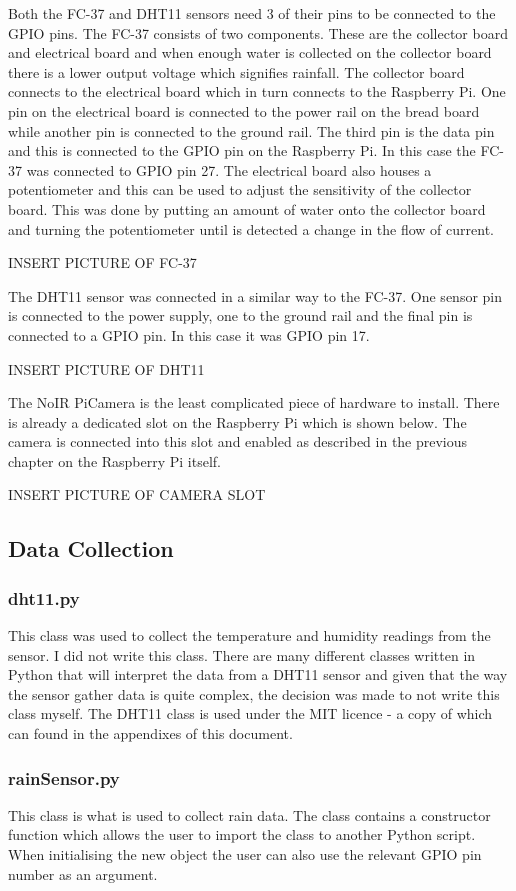 \documentclass[10pt,a4paper]{article}
\begin{document}
Both the FC-37 and DHT11 sensors need 3 of their pins to be connected to the GPIO pins. The FC-37 consists of two components. These are the collector board and electrical board and when enough water is collected on the collector board there is a lower output voltage which signifies rainfall. The collector board connects to the electrical board which in turn connects to the Raspberry Pi. One pin on the electrical board is connected to the power rail on the bread board while another pin is connected to the ground rail. The third pin is the data pin and this is connected to the GPIO pin on the Raspberry Pi. In this case the FC-37 was connected to GPIO pin 27. The electrical board also houses a potentiometer and this can be used to adjust the sensitivity of the collector board. This was done by putting an amount of water onto the collector board and turning the potentiometer until is detected a change in the flow of current.

INSERT PICTURE OF FC-37

The DHT11 sensor was connected in a similar way to the FC-37. One sensor pin is connected to the power supply, one to the ground rail and the final pin is connected to a GPIO pin. In this case it was GPIO pin 17. 

INSERT PICTURE OF DHT11

The NoIR PiCamera is the least complicated piece of hardware to install. There is already a dedicated slot on the Raspberry Pi which is shown below. The camera is connected into this slot and enabled as described in the previous chapter on the Raspberry Pi itself. 

INSERT PICTURE OF CAMERA SLOT

\subsection{Data Collection}
\subsubsection{dht11.py}
This class was used to collect the temperature and humidity readings from the sensor. I did not write this class. There are many different classes written in Python that will interpret the data from a DHT11 sensor and given that the way the sensor gather data is quite complex, the decision was made to not write this class myself. The DHT11 class is used under the MIT licence - a copy of which can found in the appendixes of this document. 

\subsubsection{rainSensor.py}
This class is what is used to collect rain data. The class contains a constructor function which allows the user to import the class to another Python script. When initialising the new object the user can also use the relevant GPIO pin number as an argument. 
\end{document}
